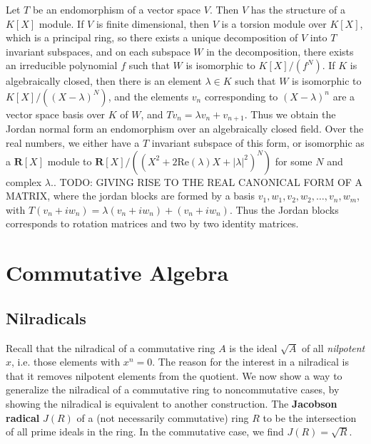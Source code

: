 \begin{example}
    Let $T$ be an endomorphism of a vector space $V$. Then $V$ has the structure of a $K[X]$ module. If $V$ is finite dimensional, then $V$ is a torsion module over $K[X]$, which is a principal ring, so there exists a unique decomposition of $V$ into $T$ invariant subspaces, and on each subspace $W$ in the decomposition, there exists an irreducible polynomial $f$ such that $W$ is isomorphic to $K[X]/(f^N)$. If $K$ is algebraically closed, then there is an element $\lambda \in K$ such that $W$ is isomorphic to $K[X]/((X - \lambda)^N)$, and the elements $v_n$ corresponding to $(X - \lambda)^n$ are a vector space basis over $K$ of $W$, and $Tv_n = \lambda v_n + v_{n+1}$. Thus we obtain the Jordan normal form an endomorphism over an algebraically closed field. Over the real numbers, we either have a $T$ invariant subspace of this form, or isomorphic as a $\mathbf{R}[X]$ module to $\mathbf{R}[X]/((X^2 + 2 \text{Re}(\lambda) X + |\lambda|^2)^N)$ for some $N$ and complex $\lambda$.. TODO: GIVING RISE TO THE REAL CANONICAL FORM OF A MATRIX, where the jordan blocks are formed by a basis $v_1,w_1, v_2, w_2, \dots, v_n,w_m$, with $T(v_n + iw_n) = \lambda(v_n + iw_n) + (v_n + iw_n)$. Thus the Jordan blocks corresponds to rotation matrices and two by two identity matrices.
\end{example}




\chapter{Commutative Algebra}

\section{Nilradicals}

Recall that the nilradical of a commutative ring $A$ is the ideal $\sqrt{A}$ of all {\it nilpotent} $x$, i.e. those elements with $x^n = 0$. The reason for the interest in a nilradical is that it removes nilpotent elements from the quotient. We now show a way to generalize the nilradical of a commutative ring to noncommutative cases, by showing the nilradical is equivalent to another construction. The {\bf Jacobson radical} $J(R)$ of a (not necessarily commutative) ring $R$ to be the intersection of all prime ideals in the ring. In the commutative case, we find $J(R) = \sqrt{R}$.

